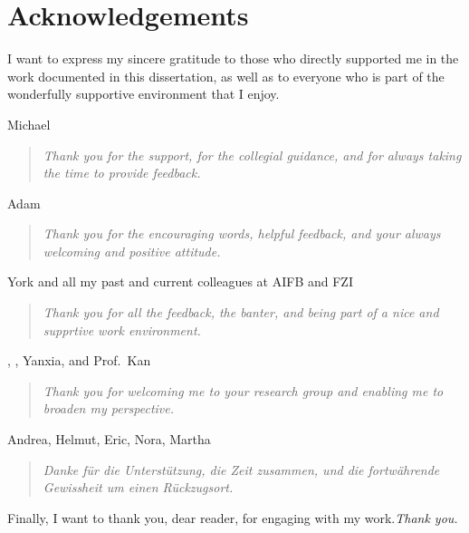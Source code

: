 \chapter{Acknowledgements}

I want to express my sincere gratitude to those who directly supported me in the work documented in this dissertation, as well as to everyone who is part of the wonderfully supportive environment that I enjoy.
\vspace{1.5em}

Michael
\begin{quote}
\emph{Thank you for the support, for the collegial guidance, and for always taking the time to provide feedback.}
\end{quote}

Adam
\begin{quote}
\emph{Thank you for the encouraging words, helpful feedback, and your always welcoming and positive attitude.}
\end{quote}

York and all my past and current colleagues at AIFB and FZI
\begin{quote}
\emph{Thank you for all the feedback, the banter, and being part of a nice and supprtive work environment.}
\end{quote}

, , Yanxia, and Prof.\ Kan
\begin{quote}
\emph{Thank you for welcoming me to your research group and enabling me to broaden my perspective.}
\end{quote}

Andrea, Helmut, Eric, Nora, Martha
\begin{quote}
\emph{Danke für die Unterstützung, die Zeit zusammen, und die fortwährende Gewissheit um einen Rückzugsort.}
\end{quote}

\begin{quote}
\end{quote}

\vspace{1.5em}
Finally, I want to thank you, dear reader, for engaging with my work.\hfill\emph{Thank you.}

